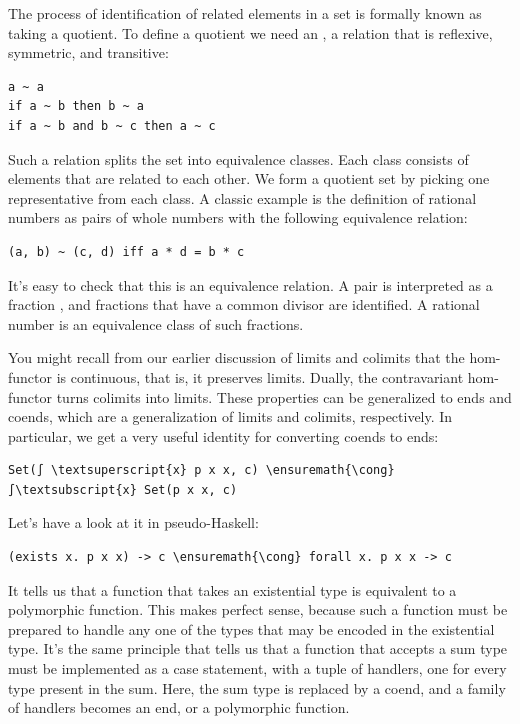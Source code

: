 The process of identification of related elements in a set is formally
known as taking a quotient. To define a quotient we need an
 \code{\textasciitilde{}}, a relation that
is reflexive, symmetric, and transitive:

\begin{Verbatim}[commandchars=\\\{\}]
a ~ a
if a ~ b then b ~ a
if a ~ b and b ~ c then a ~ c
\end{Verbatim}
Such a relation splits the set into equivalence classes. Each class
consists of elements that are related to each other. We form a quotient
set by picking one representative from each class. A classic example is
the definition of rational numbers as pairs of whole numbers with the
following equivalence relation:

\begin{Verbatim}[commandchars=\\\{\}]
(a, b) ~ (c, d) iff a * d = b * c
\end{Verbatim}
It's easy to check that this is an equivalence relation. A pair
 is interpreted as a fraction , and
fractions that have a common divisor are identified. A rational number
is an equivalence class of such fractions.

You might recall from our earlier discussion of limits and colimits that
the hom-functor is continuous, that is, it preserves limits. Dually, the
contravariant hom-functor turns colimits into limits. These properties
can be generalized to ends and coends, which are a generalization of
limits and colimits, respectively. In particular, we get a very useful
identity for converting coends to ends:

\begin{Verbatim}[commandchars=\\\{\}]
Set(∫ \textsuperscript{x} p x x, c) \ensuremath{\cong} ∫\textsubscript{x} Set(p x x, c)
\end{Verbatim}
Let's have a look at it in pseudo-Haskell:

\begin{Verbatim}[commandchars=\\\{\}]
(exists x. p x x) -> c \ensuremath{\cong} forall x. p x x -> c
\end{Verbatim}
It tells us that a function that takes an existential type is equivalent
to a polymorphic function. This makes perfect sense, because such a
function must be prepared to handle any one of the types that may be
encoded in the existential type. It's the same principle that tells us
that a function that accepts a sum type must be implemented as a case
statement, with a tuple of handlers, one for every type present in the
sum. Here, the sum type is replaced by a coend, and a family of handlers
becomes an end, or a polymorphic function.

